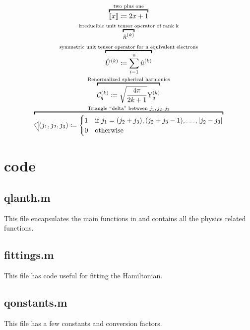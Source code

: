 \documentclass{article}
\begin{document}
\begin{gather} 
    \overbracket{\tpobraket{x} \DEF 2x+1}^{\text{two plus one}} \\
    \overbracket{\op{u}^{(k)}}^{\text{irreducible unit tensor operator of rank k}} \\ 
    \overbracket{\op{U}^{(k)} \DEF \sum_{i=1}^{n} \op{u}^{(k)} }^{\text{symmetric unit tensor operator for n equivalent electrons}} \\
    \overbracket{\Ckq{k}{q} \DEF \sqrt{\frac{4\pi}{2k+1}} \Ykq}^{\text{Renormalized spherical harmonics}} \\
    \overbracket{\tricondition{j_1,j_2,j_3} \DEF
    \begin{cases} 
        1 & \text{if } j_1 = (j_2 + j_3), (j_2 + j_3 - 1), \ldots, |j_2-j_3|\\
        0 & \text{otherwise}
        \end{cases}}^{\text{Triangle ``delta'' between $j_1,j_2,j_3$}} 
\end{gather}

\newpage

\section{code}

\subsection{qlanth.m}

This file encapsulates the main functions in \qlanth and contains all the physics related functions.



\subsection{fittings.m} 

This file has code useful for fitting the Hamiltonian.



\subsection{qonstants.m} 

This file has a few constants and conversion factors.


\end{document}
